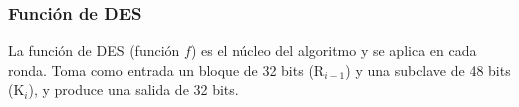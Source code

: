 \subsubsection{Función de DES}

La función de DES (función $f$) es el núcleo del algoritmo y se aplica en cada ronda. Toma como entrada un bloque de 32 bits (R$_{i-1}$) y una subclave de 48 bits (K$_i$), y produce una salida de 32 bits.











